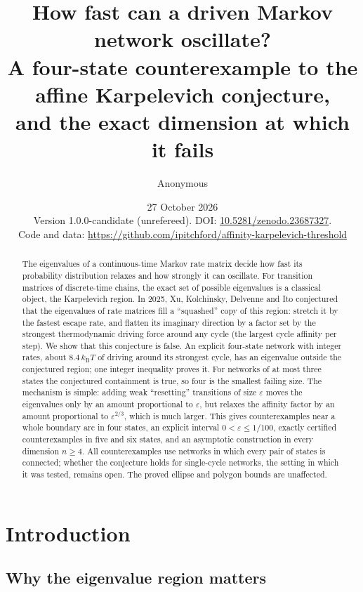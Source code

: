 \documentclass[11pt,a4paper]{article}
\title{How fast can a driven Markov network oscillate?\vspace{0.3em}\\
\large A four-state counterexample to the affine Karpelevich conjecture,\\
and the exact dimension at which it fails}
\author{Anonymous}
\date{27 October 2026\\[2pt]\small Version 1.0.0-candidate (unrefereed). DOI: \href{https://doi.org/10.5281/zenodo.23687327}{10.5281/zenodo.23687327}.\\
\small Code and data: \url{https://github.com/ipitchford/affinity-karpelevich-threshold}}
\numberwithin{equation}{section}
\theoremstyle{definition}
\theoremstyle{remark}
\newcommand{\eps}{\varepsilon}
\begin{document}
\maketitle

\begin{abstract}
The eigenvalues of a continuous-time Markov rate matrix decide how fast
its probability distribution relaxes and how strongly it can oscillate.
For transition matrices of discrete-time chains, the exact set of
possible eigenvalues is a classical object, the Karpelevich region.
In 2025, Xu, Kolchinsky, Delvenne and Ito conjectured that the
eigenvalues of rate matrices fill a ``squashed'' copy of this region:
stretch it by the fastest escape rate, and flatten its imaginary
direction by a factor set by the strongest thermodynamic driving force
around any cycle (the largest cycle affinity per step). We show that
this conjecture is false. An explicit four-state network with integer
rates, about \(8.4\,k_{\mathrm B}T\) of driving around its strongest
cycle, has an eigenvalue outside the conjectured region; one integer
inequality proves it. For networks of at most three states the
conjectured containment is true, so four is the smallest failing size.
The mechanism is simple: adding weak ``resetting'' transitions of size
\(\eps\) moves the eigenvalues only by an amount proportional to
\(\eps\), but relaxes the affinity factor by an amount proportional to
\(\eps^{2/3}\), which is much larger. This gives counterexamples near a
whole boundary arc in four states, an explicit interval
\(0<\eps\le 1/100\), exactly certified counterexamples in five and six
states, and an asymptotic construction in every dimension \(n\ge4\).
All counterexamples use networks in which every pair of states is
connected; whether the conjecture holds for single-cycle networks, the
setting in which it was tested, remains open. The proved ellipse and
polygon bounds are unaffected.
\end{abstract}

\section{Introduction}
\label{sec:intro}

\subsection{Why the eigenvalue region matters}
\end{document}
